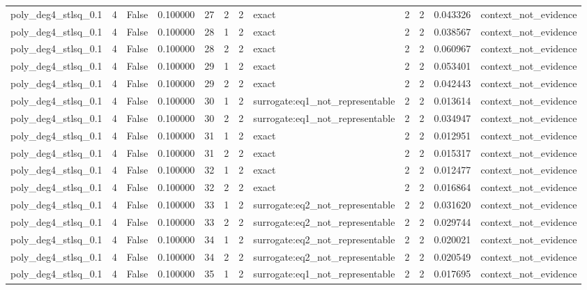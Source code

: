 \begin{tabular}{lrrrrrrlrrrl}
poly\_deg4\_stlsq\_0.1 & 4 & False & 0.100000 & 27 & 2 & 2 & exact & 2 & 2 & 0.043326 & context\_not\_evidence \\
poly\_deg4\_stlsq\_0.1 & 4 & False & 0.100000 & 28 & 1 & 2 & exact & 2 & 2 & 0.038567 & context\_not\_evidence \\
poly\_deg4\_stlsq\_0.1 & 4 & False & 0.100000 & 28 & 2 & 2 & exact & 2 & 2 & 0.060967 & context\_not\_evidence \\
poly\_deg4\_stlsq\_0.1 & 4 & False & 0.100000 & 29 & 1 & 2 & exact & 2 & 2 & 0.053401 & context\_not\_evidence \\
poly\_deg4\_stlsq\_0.1 & 4 & False & 0.100000 & 29 & 2 & 2 & exact & 2 & 2 & 0.042443 & context\_not\_evidence \\
poly\_deg4\_stlsq\_0.1 & 4 & False & 0.100000 & 30 & 1 & 2 & surrogate:eq1\_not\_representable & 2 & 2 & 0.013614 & context\_not\_evidence \\
poly\_deg4\_stlsq\_0.1 & 4 & False & 0.100000 & 30 & 2 & 2 & surrogate:eq1\_not\_representable & 2 & 2 & 0.034947 & context\_not\_evidence \\
poly\_deg4\_stlsq\_0.1 & 4 & False & 0.100000 & 31 & 1 & 2 & exact & 2 & 2 & 0.012951 & context\_not\_evidence \\
poly\_deg4\_stlsq\_0.1 & 4 & False & 0.100000 & 31 & 2 & 2 & exact & 2 & 2 & 0.015317 & context\_not\_evidence \\
poly\_deg4\_stlsq\_0.1 & 4 & False & 0.100000 & 32 & 1 & 2 & exact & 2 & 2 & 0.012477 & context\_not\_evidence \\
poly\_deg4\_stlsq\_0.1 & 4 & False & 0.100000 & 32 & 2 & 2 & exact & 2 & 2 & 0.016864 & context\_not\_evidence \\
poly\_deg4\_stlsq\_0.1 & 4 & False & 0.100000 & 33 & 1 & 2 & surrogate:eq2\_not\_representable & 2 & 2 & 0.031620 & context\_not\_evidence \\
poly\_deg4\_stlsq\_0.1 & 4 & False & 0.100000 & 33 & 2 & 2 & surrogate:eq2\_not\_representable & 2 & 2 & 0.029744 & context\_not\_evidence \\
poly\_deg4\_stlsq\_0.1 & 4 & False & 0.100000 & 34 & 1 & 2 & surrogate:eq2\_not\_representable & 2 & 2 & 0.020021 & context\_not\_evidence \\
poly\_deg4\_stlsq\_0.1 & 4 & False & 0.100000 & 34 & 2 & 2 & surrogate:eq2\_not\_representable & 2 & 2 & 0.020549 & context\_not\_evidence \\
poly\_deg4\_stlsq\_0.1 & 4 & False & 0.100000 & 35 & 1 & 2 & surrogate:eq1\_not\_representable & 2 & 2 & 0.017695 & context\_not\_evidence \\

\end{tabular}
